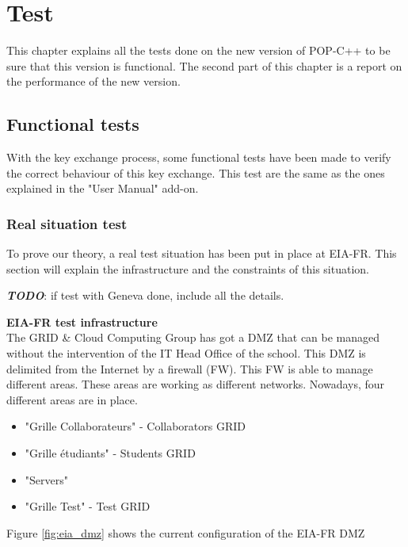 \section{Test}
\label{sec:test}
This chapter explains all the tests done on the new version of POP-C++ to be sure that this version is functional. The second part of this chapter is a report on the performance of the new version.


%
%
\subsection{Functional tests}
With the key exchange process, some functional tests have been made to verify the correct behaviour of this key exchange. This test are the same as the ones explained in the "User Manual" add-on.



%
%
\subsubsection{Real situation test}
To prove our theory, a real test situation has been put in place at EIA-FR. This section will explain the infrastructure and the constraints of this situation. \s

\textbf{\textit{TODO}}: if test with Geneva done, include all the details. \s

\textbf{EIA-FR test infrastructure}\\
The GRID \& Cloud Computing Group has got a DMZ that can be managed without the intervention of the IT Head Office of the school. This DMZ is delimited from the Internet by a firewall (FW). This FW is able to manage different areas. These areas are working as different networks. Nowadays, four different areas are in place. 

\begin{itemize}
\item "Grille Collaborateurs" - Collaborators GRID
\item "Grille étudiants" - Students GRID
\item "Servers"
\item "Grille Test" - Test GRID
\end{itemize}

Figure \ref{fig:eia_dmz} shows the current configuration of the EIA-FR DMZ

